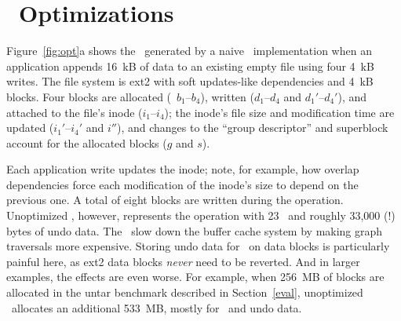
\section{\Patch\ Optimizations}
\label{sec:patch:optimizations}

\begin{comment}
A naive \Featherstitch\ implementation 
%
allows file system modules to define and modify consistency-preserving
orderings, and allows applications to add consistency requirements of their
own (using the interface described below).
%
But although all this is relatively easy, it performs badly.
\end{comment}


Figure~\ref{fig:opt}a shows the \patches\ generated by a naive \Kudos\
implementation when an application appends
16~kB of data to an existing empty file using four 4~kB writes.
%
The file system is ext2 with soft updates-like
dependencies and 4~kB blocks.
%
%
%
%
Four blocks are allocated (\patches\ $b_1$--$b_4$),
written ($d_1$--$d_4$ and $d_1'$--$d_4'$), and attached to the file's
inode ($i_1$--$i_4$); the inode's file size and modification time are updated
($i_1'$--$i_4'$ and $i''$), and changes to the ``group descriptor'' and superblock
account for the allocated blocks ($g$ and $s$).
%
\begin{comment}
The operation is broken into four one-block appends; the numeric subscripts in
the \patch\ labels indicate with which each \patch\ is associated.
\end{comment}
%
Each application write updates the inode; note, for example, how overlap
dependencies force each modification of the inode's size to depend on the
previous one.
%
A total of eight blocks are written during the operation.
%
Unoptimized \Kudos, however, represents the operation with 23 \patches\ and
roughly 33,000 (!) bytes of undo data.
%
The \patches\ slow down the buffer cache system by making graph traversals
more expensive.
%
Storing undo data for \patches\ on data blocks is particularly painful
here, as ext2 data blocks \emph{never} need to be reverted.
%
And in larger examples, the effects are even worse. For example, when
256~MB of blocks are allocated in the untar benchmark described in
Section~\ref{eval}, unoptimized \Kudos\ allocates an additional 533~MB,
mostly for \patches\ and undo data.

